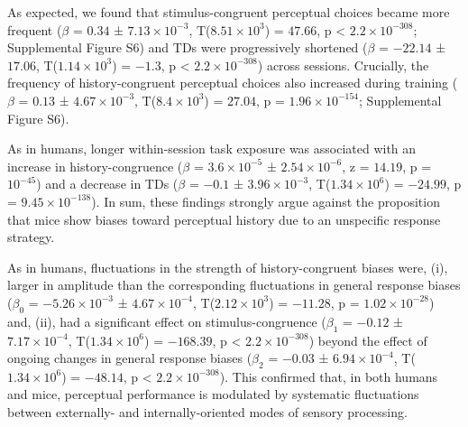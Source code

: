 \documentclass[
]{article}
\begin{document}
As expected, we found that stimulus-congruent perceptual choices became
more frequent (\(\beta\) = \(0.34\) ±
\(\ensuremath{7.13\times 10^{-3}}\),
T(\(\ensuremath{8.51\times 10^{3}}\)) = \(47.66\), p < \(\ensuremath{2.2\times 10^{-308}}\);
Supplemental Figure S6) and TDs were progressively shortened (\(\beta\)
= \(-22.14\) ± \(17.06\), T(\(\ensuremath{1.14\times 10^{3}}\)) =
\(-1.3\), p < \(\ensuremath{2.2\times 10^{-308}}\)) across sessions. Crucially, the frequency of
history-congruent perceptual choices also increased during training
(\(\beta\) = \(0.13\) ± \(\ensuremath{4.67\times 10^{-3}}\),
T(\(\ensuremath{8.4\times 10^{3}}\)) = \(27.04\), p =
\(\ensuremath{1.96\times 10^{-154}}\); Supplemental Figure S6).

As in humans, longer within-session task exposure was associated with an
increase in history-congruence (\(\beta\) =
\(\ensuremath{3.6\times 10^{-5}}\) ±
\(\ensuremath{2.54\times 10^{-6}}\), z = \(14.19\), p =
\(\ensuremath{10^{-45}}\)) and a decrease in TDs (\(\beta\) = \(-0.1\) ±
\(\ensuremath{3.96\times 10^{-3}}\),
T(\(\ensuremath{1.34\times 10^{6}}\)) = \(-24.99\), p =
\(\ensuremath{9.45\times 10^{-138}}\)). In sum, these findings strongly
argue against the proposition that mice show biases toward perceptual
history due to an unspecific response strategy.

As in humans, fluctuations in the strength of history-congruent biases
were, (i), larger in amplitude than the corresponding fluctuations in
general response biases (\(\beta_0\) =
\(\ensuremath{-5.26\times 10^{-3}}\) ±
\(\ensuremath{4.67\times 10^{-4}}\),
T(\(\ensuremath{2.12\times 10^{3}}\)) = \(-11.28\), p =
\(\ensuremath{1.02\times 10^{-28}}\)) and, (ii), had a significant
effect on stimulus-congruence (\(\beta_1\) = \(-0.12\) ±
\(\ensuremath{7.17\times 10^{-4}}\),
T(\(\ensuremath{1.34\times 10^{6}}\)) = \(-168.39\), p < \(\ensuremath{2.2\times 10^{-308}}\)) beyond
the effect of ongoing changes in general response biases (\(\beta_2\) =
\(-0.03\) ± \(\ensuremath{6.94\times 10^{-4}}\),
T(\(\ensuremath{1.34\times 10^{6}}\)) = \(-48.14\), p < \(\ensuremath{2.2\times 10^{-308}}\)). This
confirmed that, in both humans and mice, perceptual performance is
modulated by systematic fluctuations between externally- and
internally-oriented modes of sensory processing.
\end{document}
